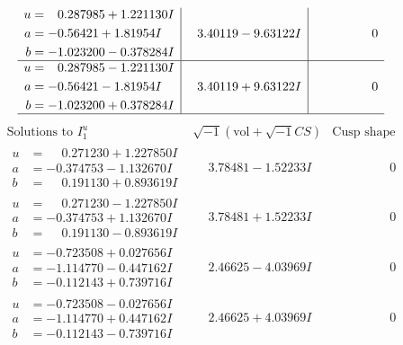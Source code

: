 \documentclass[1p]{elsarticle_modified}
\theoremstyle{definition}
\newcommand{\I}{\sqrt{-1}}
\begin{document}
$$\begin{array}{c|c|c}
\begin{aligned}
u &= \phantom{-}0.287985 + 1.221130 I \\
a &= -0.56421 + 1.81954 I \\
b &= -1.023200 - 0.378284 I\end{aligned}
 & \phantom{-}3.40119 - 9.63122 I & \phantom{-0.000000 } 0 \\ \hline\begin{aligned}
u &= \phantom{-}0.287985 - 1.221130 I \\
a &= -0.56421 - 1.81954 I \\
b &= -1.023200 + 0.378284 I\end{aligned}
 & \phantom{-}3.40119 + 9.63122 I & \phantom{-0.000000 } 0\\
 \hline 
 \end{array}$$\newpage$$\begin{array}{c|c|c}  
\text{Solutions to }I^u_{1}& \I (\text{vol} + \sqrt{-1}CS) & \text{Cusp shape}\\
 \hline 
\begin{aligned}
u &= \phantom{-}0.271230 + 1.227850 I \\
a &= -0.374753 - 1.132670 I \\
b &= \phantom{-}0.191130 + 0.893619 I\end{aligned}
 & \phantom{-}3.78481 - 1.52233 I & \phantom{-0.000000 } 0 \\ \hline\begin{aligned}
u &= \phantom{-}0.271230 - 1.227850 I \\
a &= -0.374753 + 1.132670 I \\
b &= \phantom{-}0.191130 - 0.893619 I\end{aligned}
 & \phantom{-}3.78481 + 1.52233 I & \phantom{-0.000000 } 0 \\ \hline\begin{aligned}
u &= -0.723508 + 0.027656 I \\
a &= -1.114770 - 0.447162 I \\
b &= -0.112143 + 0.739716 I\end{aligned}
 & \phantom{-}2.46625 - 4.03969 I & \phantom{-0.000000 } 0 \\ \hline\begin{aligned}
u &= -0.723508 - 0.027656 I \\
a &= -1.114770 + 0.447162 I \\
b &= -0.112143 - 0.739716 I\end{aligned}
 & \phantom{-}2.46625 + 4.03969 I & \phantom{-0.000000 } 0 \\ \hline\begin{aligned}

\end{aligned}
\end{array}$$
\end{document}
